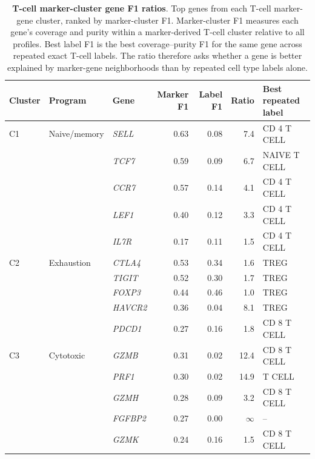 \begin{table}[ht!]
  \centering
  \caption{\textbf{T-cell marker-cluster gene F1 ratios}. Top genes from each T-cell marker-gene cluster, ranked by marker-cluster F1. Marker-cluster F1 measures each gene's coverage and purity within a marker-derived T-cell cluster relative to all profiles. Best label F1 is the best coverage--purity F1 for the same gene across repeated exact T-cell labels. The ratio therefore asks whether a gene is better explained by marker-gene neighborhoods than by repeated cell type labels alone.}
  \label{tab:tcell_gene_f1_ratios}%
  \footnotesize
  \setlength{\tabcolsep}{4pt}
  \begin{tabular}{@{}l l l r r r l@{}}
  \toprule
  Cluster & Program & Gene & Marker F1 & Label F1 & Ratio & Best repeated label \\
  \midrule
  C1 & Naive/memory & \textit{SELL} & 0.63 & 0.08 & 7.4 & CD 4 T CELL \\
   &  & \textit{TCF7} & 0.59 & 0.09 & 6.7 & NAIVE T CELL \\
   &  & \textit{CCR7} & 0.57 & 0.14 & 4.1 & CD 4 T CELL \\
   &  & \textit{LEF1} & 0.40 & 0.12 & 3.3 & CD 4 T CELL \\
   &  & \textit{IL7R} & 0.17 & 0.11 & 1.5 & CD 4 T CELL \\
  \addlinespace[2pt]
  C2 & Exhaustion & \textit{CTLA4} & 0.53 & 0.34 & 1.6 & TREG \\
   &  & \textit{TIGIT} & 0.52 & 0.30 & 1.7 & TREG \\
   &  & \textit{FOXP3} & 0.44 & 0.46 & 1.0 & TREG \\
   &  & \textit{HAVCR2} & 0.36 & 0.04 & 8.1 & TREG \\
   &  & \textit{PDCD1} & 0.27 & 0.16 & 1.8 & CD 8 T CELL \\
  \addlinespace[2pt]
  C3 & Cytotoxic & \textit{GZMB} & 0.31 & 0.02 & 12.4 & CD 8 T CELL \\
   &  & \textit{PRF1} & 0.30 & 0.02 & 14.9 & T CELL \\
   &  & \textit{GZMH} & 0.28 & 0.09 & 3.2 & CD 8 T CELL \\
   &  & \textit{FGFBP2} & 0.27 & 0.00 & $\infty$ & -- \\
   &  & \textit{GZMK} & 0.24 & 0.16 & 1.5 & CD 8 T CELL \\

\end{tabular}
\end{table}
